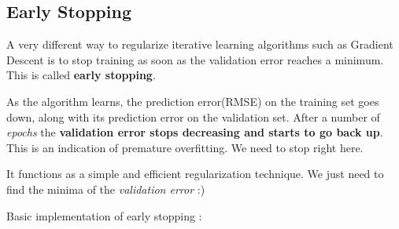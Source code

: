 \documentclass[11pt, a4paper]{book}
\begin{document}
    \hypertarget{early-stopping}{%
\subsection{Early Stopping}\label{early-stopping}}

A very different way to regularize iterative learning algorithms such as
Gradient Descent is to stop training as soon as the validation error
reaches a minimum. This is called \textbf{early stopping}.

As the algorithm learns, the prediction error(RMSE) on the training set
goes down, along with its prediction error on the validation set. After
a number of \emph{epochs} the \textbf{validation error stops decreasing
and starts to go back up}. This is an indication of premature
overfitting. We need to stop right here.

It functions as a simple and efficient regularization technique. We just
need to find the minima of the \emph{validation error} :)

Basic implementation of early stopping :
\end{document}
